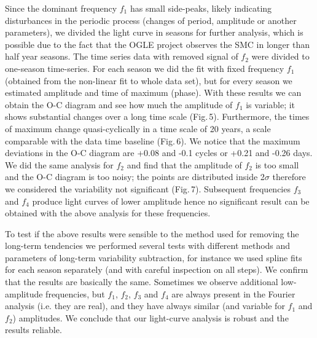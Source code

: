 \documentclass[useAMS,usenatbib]{mn2e}
\begin{document}
Since the dominant frequency $f_1$  has
small side-peaks, likely indicating disturbances in 
the periodic process (changes of period, amplitude
or another parameters), we divided the light curve in seasons for further analysis, which is possible due to the fact that the OGLE project observes
the SMC in longer than half year seasons.
 The time series data with removed signal of $f_2$ were divided
to one-season time-series. For each season we did the fit
with fixed frequency $f_1$ (obtained from the non-linear fit
to whole data set), but for every season we estimated amplitude and time of maximum (phase). With these results we can
obtain the O-C diagram and see how much the amplitude
of $f_1$ is variable; it shows substantial changes over a long
time scale (Fig.\,5). Furthermore, the times of maximum change quasi-cyclically in a time scale of 20 years, a scale
comparable with the data time baseline (Fig.\,6). We notice that the maximum deviations in the O-C diagram are +0.08 and -0.1 cycles or
+0.21 and -0.26 days.    
We did the same analysis for $f_2$ and find that
the amplitude of $f_2$ is too small and the O-C diagram is too
noisy; the points are distributed inside 2$\sigma$  therefore we considered the variability not significant (Fig.\,7). 
Subsequent frequencies $f_3$ and $f_4$ produce light curves of lower amplitude hence no significant result can be obtained with the above analysis
for these frequencies.

To test if the above results were sensible to the method used for removing the long-term tendencies we performed 
several tests with different methods and parameters
of long-term variability subtraction, for instance we used spline
fits for each season separately (and with careful inspection on all steps). We confirm that the results are basically the same.
Sometimes we observe additional low-amplitude frequencies, but $f_1$, $f_2$, $f_3$ and $f_4$
are always present in the Fourier analysis (i.e. they are real),
and they have always similar (and variable for $f_1$ and $f_2$) amplitudes.
We conclude that our light-curve analysis is robust and the results reliable.
  


\end{document}
